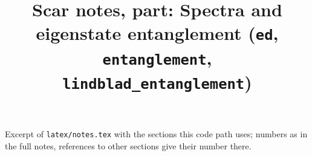 \documentclass[11pt,a4paper]{article}
\title{Scar notes, part: Spectra and eigenstate entanglement (\texttt{ed}, \texttt{entanglement}, \texttt{lindblad\_entanglement})}
\begin{document}
\maketitle
\noindent Excerpt of \texttt{latex/notes.tex} with the sections this code path uses; numbers as in the full notes, references to other sections give their number there.

\tableofcontents

\end{document}
